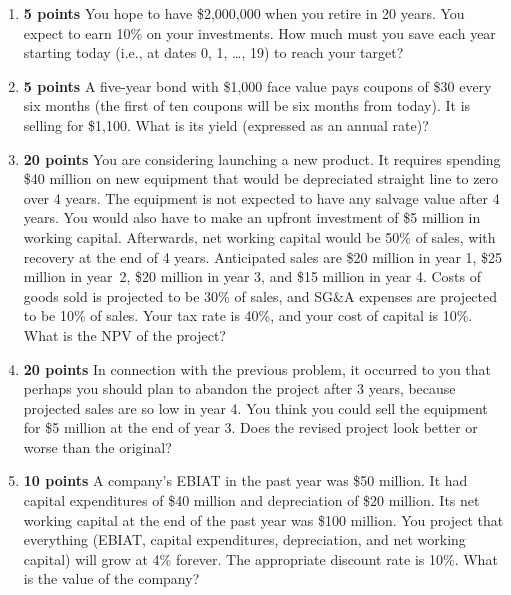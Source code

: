 \documentclass[english,12pt]{amsart}
\begin{document}
\thispagestyle{fancy}
\vspace*{0.4in}

\vskip 0.4in
 

 \vspace*{0.25in}
 \begin{enumerate}\renewcommand{\labelenumi}{\arabic{enumi}.}
 
 \item \textbf{5 points} \hspace{0.5ex}  You hope to have \$2,000,000 when you retire in 20 years.  You expect to earn 10\% on your investments.  How much must you save each year starting today (i.e., at dates 0, 1, \ldots, 19) to reach your target?
 \item \textbf{5 points} \hspace{0.5ex}  A five-year bond with \$1,000 face value pays coupons of \$30 every six months (the first of ten coupons will be six months from today).  It is selling for \$1,100.  What is its yield (expressed as an annual rate)?
 \item \textbf{20 points} \hspace{0.5ex} You are considering launching a new product.  It requires spending \$40 million on new equipment that would be depreciated straight line to zero over 4 years.  The equipment is not expected to have any salvage value after 4 years.  You would also have to make an upfront  investment of \$5 million in working capital.  Afterwards, net working capital would be 50\% of sales, with recovery at the end of 4 years.  Anticipated sales are \$20 million in year 1, \$25 million in year~2, \$20 million in year 3, and \$15 million in year 4.  Costs of goods sold is projected to be 30\% of sales, and SG\&A expenses are projected to be 10\% of sales.  Your tax rate is 40\%, and your cost of capital is 10\%.  What is the NPV of the project?
 \item \textbf{20 points} \hspace{0.5ex}  In connection with the previous problem, it occurred to you that perhaps you should plan to abandon the project after 3 years, because projected sales are so low in year 4.  You think you could sell the equipment for \$5 million at the end of year 3.  Does the revised project look better or worse than the original?
 \item \textbf{10 points} \hspace{0.5ex}  A company's EBIAT in the past year was \$50 million.  It had capital expenditures of \$40 million and depreciation of \$20 million.  Its net working capital at the end of the past year was \$100 million.  You project that everything (EBIAT, capital expenditures, depreciation, and net working capital) will grow at 4\% forever.  The appropriate discount rate is 10\%.  What is the value of the company?

\end{enumerate}
\end{document}
